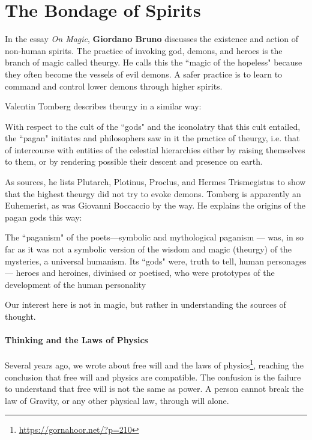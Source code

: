 \section{The Bondage of Spirits}

In the essay \emph{On Magic}, \textbf{Giordano Bruno} discusses the existence and action of non-human spirits. The practice of invoking god, demons, and heroes is the branch of magic called theurgy. He calls this the ``magic of the hopeless" because they often become the vessels of evil demons. A safer practice is to learn to command and control lower demons through higher spirits.

Valentin Tomberg describes theurgy in a similar way:

\begin{quotex}
With respect to the cult of the ``gods" and the iconolatry that this cult entailed, the ``pagan" initiates and philosophers saw in it the practice of theurgy, i.e. that of intercourse with entities of the celestial hierarchies either by raising themselves to them, or by rendering possible their descent and presence on earth.

\end{quotex}
As sources, he lists Plutarch, Plotinus, Proclus, and Hermes Trismegistus to show that the highest theurgy did not try to evoke demons. Tomberg is apparently an Euhemerist, as was Giovanni Boccaccio by the way. He explains the origins of the pagan gods this way:

\begin{quotex}
The ``paganism" of the poets—symbolic and mythological paganism — was, in so far as it was not a symbolic version of the wisdom and magic (theurgy) of the mysteries, a universal humanism. Its ``gods" were, truth to tell, human personages — heroes and heroines, divinised or poetised, who were prototypes of the development of the human personality

\end{quotex}
Our interest here is not in magic, but rather in understanding the sources of thought.

\paragraph{Thinking and the Laws of Physics}
Several years ago, we wrote about free will and the laws of physics\footnote{\url{https://gornahoor.net/?p=210}}, reaching the conclusion that free will and physics are compatible. The confusion is the failure to understand that free will is not the same as power. A person cannot break the law of Gravity, or any other physical law, through will alone.

